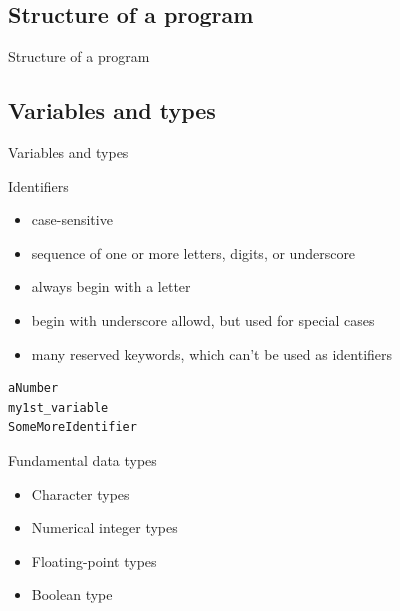 \documentclass{beamer}
\begin{document}
\subsection{Structure of a program}
\begin{frame}{Structure of a program}
\end{frame}

\subsection{Variables and types}
\begin{frame}{Variables and types}
\end{frame}


\begin{frame}[fragile]{Identifiers}
\begin{itemize}
  \item case-sensitive
  \item sequence of one or more letters, digits, or underscore
  \item always begin with a letter
  \item begin with underscore allowd, but used for special cases
  \item many reserved keywords, which can't be used as identifiers 
\end{itemize}
\begin{lstlisting}[caption=Identifiers Examples]
aNumber
my1st_variable
SomeMoreIdentifier
\end{lstlisting}
\end{frame}

\begin{frame}{Fundamental data types}
\begin{itemize}
  \item Character types
  \item Numerical integer types
  \item Floating-point types
  \item Boolean type
\end{itemize}
\end{frame}
\end{document}
